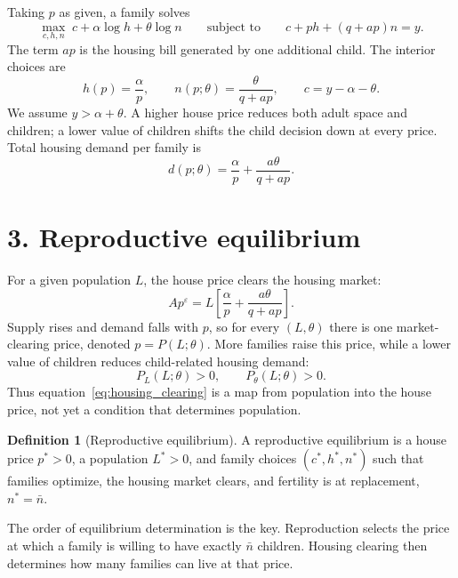 \documentclass[11pt]{article}
\theoremstyle{definition}
\newtheorem{definition}{Definition}
\begin{document}
Taking $p$ as given, a family solves
\begin{equation}
 \max_{c,h,n}\;c+\alpha\log h+\theta\log n
 \qquad\text{subject to}\qquad
 c+ph+(q+ap)n=y.
 \label{eq:family_problem}
\end{equation}
The term $ap$ is the housing bill generated by one additional child. The
interior choices are
\begin{equation}
 h(p)=\frac{\alpha}{p},
 \qquad
 n(p;\theta)=\frac{\theta}{q+ap},
 \qquad
 c=y-\alpha-\theta.
 \label{eq:demands}
\end{equation}
We assume $y>\alpha+\theta$. A higher house price reduces both adult space and
children; a lower value of children shifts the child decision down at every
price. Total housing demand per family is
\begin{equation}
 d(p;\theta)=\frac{\alpha}{p}+\frac{a\theta}{q+ap}.
 \label{eq:per_family_demand}
\end{equation}

\section*{3. Reproductive equilibrium}

For a given population $L$, the house price clears the housing market:
\begin{equation}
 A p^{\varepsilon}=L\left[
 \frac{\alpha}{p}+\frac{a\theta}{q+ap}
 \right].
 \label{eq:housing_clearing}
\end{equation}
Supply rises and demand falls with $p$, so for every $(L,\theta)$ there is one
market-clearing price, denoted $p=P(L;\theta)$. More families raise this price,
while a lower value of children reduces child-related housing demand:
\begin{equation}
 P_L(L;\theta)>0,
 \qquad
 P_\theta(L;\theta)>0.
 \label{eq:price_schedule_signs}
\end{equation}
Thus equation~\eqref{eq:housing_clearing} is a map from population into the
house price, not yet a condition that determines population.

\begin{definition}[Reproductive equilibrium]
A reproductive equilibrium is a house price $p^*>0$, a population $L^*>0$,
and family choices $(c^*,h^*,n^*)$ such that families optimize, the housing
market clears, and fertility is at replacement, $n^*=\bar n$.
\end{definition}

The order of equilibrium determination is the key. Reproduction selects the
price at which a family is willing to have exactly $\bar n$ children. Housing
clearing then determines how many families can live at that price.
\end{document}
